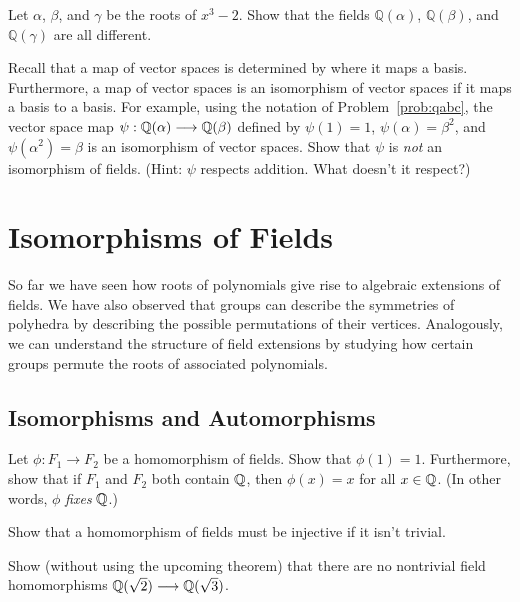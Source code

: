 \begin{problem}\label{prob:qabc}
Let $\alpha$, $\beta$, and $\gamma$ be the roots of $x^3-2$.  Show that the fields $\mathbb{Q}(\alpha)$, $\mathbb{Q}(\beta)$,  and $\mathbb{Q}(\gamma)$ are all different.
\end{problem}



\begin{problem}
    Recall that a map of vector spaces is determined by where it maps a basis. Furthermore, a map of vector spaces is an isomorphism of vector spaces if it maps a basis to a basis. For example, using the notation of Problem~\ref{prob:qabc}, the vector space map $\psi:\mathbb{Q}(\alpha) \longrightarrow \mathbb{Q}(\beta)$ defined by $\psi(1)=1$, $\psi(\alpha)=\beta^2$, and $\psi(\alpha^2)=\beta$ is an isomorphism of vector spaces. Show that $\psi$ is \textit{not} an isomorphism of fields. (Hint: $\psi$ respects addition. What doesn't it respect?)
\end{problem}

\chapter{Isomorphisms of Fields}

So far we have seen how roots of polynomials give rise to algebraic extensions of fields. We have also observed that groups can describe the symmetries of polyhedra by describing the possible permutations of their vertices. Analogously, we can understand the structure of field extensions by studying how certain groups permute the roots of associated polynomials.

\section{Isomorphisms and Automorphisms}

\begin{problem}
Let $\phi: F_1 \longrightarrow F_2$ be a homomorphism of fields. Show that $\phi(1) = 1$. Furthermore, show that if $F_1$ and $F_2$ both contain $\mathbb{Q}$, then $\phi(x) = x$ for all $x\in \mathbb{Q}$. (In other words, $\phi$ \textit{fixes} $\mathbb{Q}$.)
\end{problem}

\begin{problem}
Show that a homomorphism of fields must be injective if it isn't trivial.
\end{problem}

\begin{problem}
    Show (without using the upcoming theorem) that there are no nontrivial field homomorphisms $\mathbb{Q}(\sqrt{2}) \longrightarrow \mathbb{Q}(\sqrt{3})$.
\end{problem}

